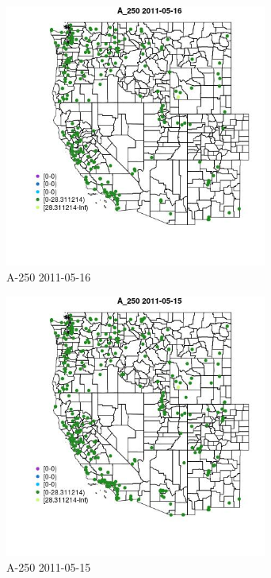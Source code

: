 \begin{figure} 
\centering  
\includegraphics[width=0.77\textwidth]{Code_Outputs/ML_input_report_ML_input_PM25_Step5_part_d_de_duplicated_aves_ML_input_MapObsA_2502011-05-16.jpg} 
\caption{\label{fig:ML_input_report_ML_input_PM25_Step5_part_d_de_duplicated_aves_ML_inputMapObsA_2502011-05-16}A-250 2011-05-16} 
\end{figure} 
 

\begin{figure} 
\centering  
\includegraphics[width=0.77\textwidth]{Code_Outputs/ML_input_report_ML_input_PM25_Step5_part_d_de_duplicated_aves_ML_input_MapObsA_2502011-05-15.jpg} 
\caption{\label{fig:ML_input_report_ML_input_PM25_Step5_part_d_de_duplicated_aves_ML_inputMapObsA_2502011-05-15}A-250 2011-05-15} 
\end{figure} 
 

